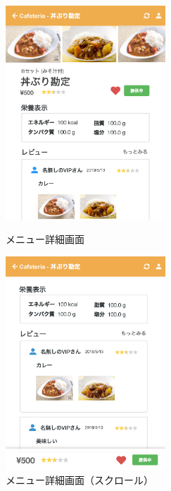 \documentclass[a4paper]{ltjsarticle}
\begin{document}
        \begin{figure}[ht]
            \begin{minipage}[t]{.49\textwidth}
                \center
                \includegraphics[width=60mm]{ui/detail-head.png}
                \caption{メニュー詳細画面}
                \label{img:detail-head}
            \end{minipage}
            \begin{minipage}[t]{.49\textwidth}
                \center
                \includegraphics[width=60mm]{ui/detail-tail.png}
                \caption{メニュー詳細画面（スクロール）}
                \label{img:detail-tail}
            \end{minipage}
        \end{figure}
\end{document}
